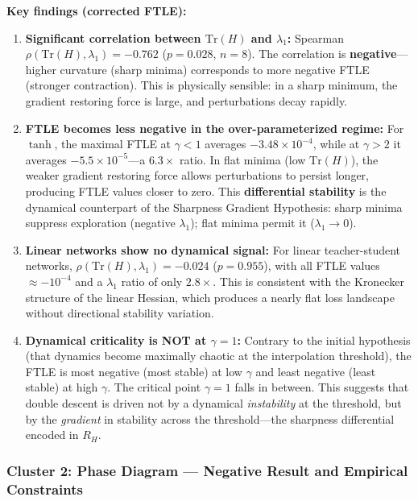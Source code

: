 \documentclass[
  journal=largetwo,
  simfonts=false,
  year=2025,
  volume=37,
]{cup-journal}
\begin{document}
\textbf{Key findings (corrected FTLE):}
\begin{enumerate}
    \item \textbf{Significant correlation between $\mathrm{Tr}(H)$ and $\lambda_1$:} Spearman $\rho(\mathrm{Tr}(H), \lambda_1) = -0.762$ ($p = 0.028$, $n=8$). The correlation is \textbf{negative}---higher curvature (sharp minima) corresponds to more negative FTLE (stronger contraction). This is physically sensible: in a sharp minimum, the gradient restoring force is large, and perturbations decay rapidly.
    
    \item \textbf{FTLE becomes less negative in the over-parameterized regime:} For $\tanh$, the maximal FTLE at $\gamma < 1$ averages $-3.48 \times 10^{-4}$, while at $\gamma > 2$ it averages $-5.5 \times 10^{-5}$---a $6.3\times$ ratio. In flat minima (low $\mathrm{Tr}(H)$), the weaker gradient restoring force allows perturbations to persist longer, producing FTLE values closer to zero. This \textbf{differential stability} is the dynamical counterpart of the Sharpness Gradient Hypothesis: sharp minima suppress exploration (negative $\lambda_1$); flat minima permit it ($\lambda_1 \to 0$).
    
    \item \textbf{Linear networks show no dynamical signal:} For linear teacher-student networks, $\rho(\mathrm{Tr}(H), \lambda_1) = -0.024$ ($p = 0.955$), with all FTLE values $\approx -10^{-4}$ and a $\lambda_1$ ratio of only $2.8\times$. This is consistent with the Kronecker structure of the linear Hessian, which produces a nearly flat loss landscape without directional stability variation.
    
    \item \textbf{Dynamical criticality is NOT at $\gamma=1$:} Contrary to the initial hypothesis (that dynamics become maximally chaotic at the interpolation threshold), the FTLE is most negative (most stable) at low $\gamma$ and least negative (least stable) at high $\gamma$. The critical point $\gamma=1$ falls in between. This suggests that double descent is driven not by a dynamical \emph{instability} at the threshold, but by the \emph{gradient} in stability across the threshold---the sharpness differential encoded in $R_H$.
\end{enumerate}

\subsubsection{Cluster 2: Phase Diagram --- Negative Result and Empirical Constraints}
\end{document}
